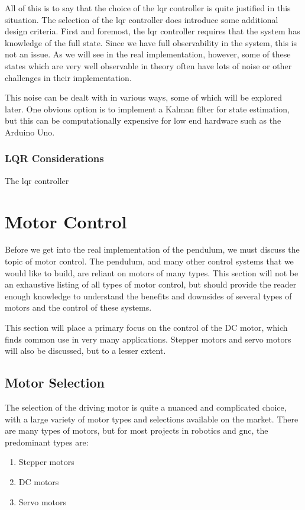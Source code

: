 All of this is to say that the choice of the \gls{lqr} controller is quite justified in this situation. The selection of the \gls{lqr} controller does introduce some additional design criteria. First and foremost, the \gls{lqr} controller requires that the system has knowledge of the full state. Since we have full observability in the system, this is not an issue. As we will see in the real implementation, however, some of these states which are very well observable in theory often have lots of noise or other challenges in their implementation.

This noise can be dealt with in various ways, some of which will be explored later. One obvious option is to implement a Kalman filter for state estimation, but this can be computationally expensive for low end hardware such as the Arduino Uno.

\subsubsection{LQR Considerations}

The \gls{lqr} controller 


\section{Motor Control}
Before we get into the real implementation of the pendulum, we must discuss the topic of motor control. The pendulum, and many other control systems that we would like to build, are reliant on motors of many types. This section will not be an exhaustive listing of all types of motor control, but should provide the reader enough knowledge to understand the benefits and downsides of several types of motors and the control of these systems.

This section will place a primary focus on the control of the DC motor, which finds common use in very many applications. Stepper motors and servo motors will also be discussed, but to a lesser extent. 

\subsection{Motor Selection}
The selection of the driving motor is quite a nuanced and complicated choice, with a large variety of motor types and selections available on the market. There are many types of motors, but for most projects in robotics and \gls{gnc}, the predominant types are: 
\begin{enumerate}
    \item Stepper motors
    \item DC motors
    \item Servo motors
\end{enumerate}

